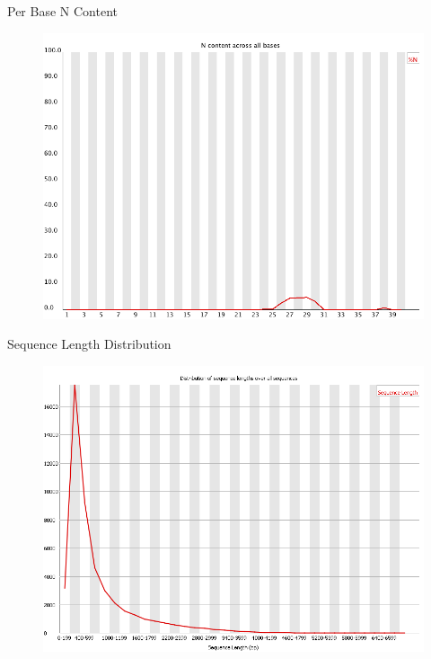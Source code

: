 \begin{frame}{Per Base N Content}

\begin{figure}[htbp]
\centering
\includegraphics[width=\textwidth,height=0.8\textheight,keepaspectratio]{images/per_base_n_content}
\end{figure}

\end{frame}

\begin{frame}{Sequence Length Distribution}

\begin{figure}[htbp]
\centering
\includegraphics[width=\textwidth,height=0.8\textheight,keepaspectratio]{images/sequence_length_distribution}
\end{figure}

\end{frame}

